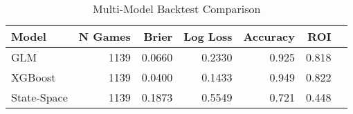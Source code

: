 \begin{table}[htbp]
\centering
\caption{Multi-Model Backtest Comparison}
\label{tab:multimodel}
\begin{tabular}{lrrrrrr}
\toprule
Model & N Games & Brier & Log Loss & Accuracy & ROI \\
\midrule
GLM & 1139 & 0.0660 & 0.2330 & 0.925 & 0.818 \\
XGBoost & 1139 & 0.0400 & 0.1433 & 0.949 & 0.822 \\
State-Space & 1139 & 0.1873 & 0.5549 & 0.721 & 0.448 \\
\bottomrule
\end{tabular}
\end{table}
